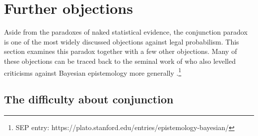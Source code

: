 \documentclass{article}
\begin{document}















 
\section{Further objections}\label{sec:Further}


Aside from the paradoxes of naked statistical evidence, the conjunction paradox is one of the most widely discussed objections against legal probabilism. This section examines this paradox together with a few other objections. Many of these objections can be traced back to the seminal work of \citet{Cohen1977The-probable-an} who also levelled criticisms against Bayesian epistemology more generally \citep[for further discussion, see][]{earman1992bayes,bovens2004bayesian,bradley2015critical}.\footnote{SEP entry: https://plato.stanford.edu/entries/epistemology-bayesian/}





\subsection{The difficulty about conjunction}
\end{document}
